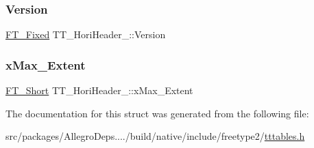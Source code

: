 \subsubsection{\texorpdfstring{Version}{Version}}
{\footnotesize\ttfamily \hyperlink{fttypes_8h_a5f5a679cc09f758efdd0d1c5feed3c3d}{F\+T\+\_\+\+Fixed} T\+T\+\_\+\+Hori\+Header\+\_\+\+::\+Version}

\mbox{\label{struct_t_t___hori_header___ab483cb323f9adc9d959209a42eb19957}} 
\subsubsection{\texorpdfstring{x\+Max\+\_\+\+Extent}{xMax\_Extent}}
{\footnotesize\ttfamily \hyperlink{fttypes_8h_aa7279be89046a2563cd3d4d6651fbdcf}{F\+T\+\_\+\+Short} T\+T\+\_\+\+Hori\+Header\+\_\+\+::x\+Max\+\_\+\+Extent}



The documentation for this struct was generated from the following file\+:\begin{DoxyCompactItemize}
\item 
src/packages/\+Allegro\+Deps..../build/native/include/freetype2/\hyperlink{tttables_8h}{tttables.\+h}\end{DoxyCompactItemize}
